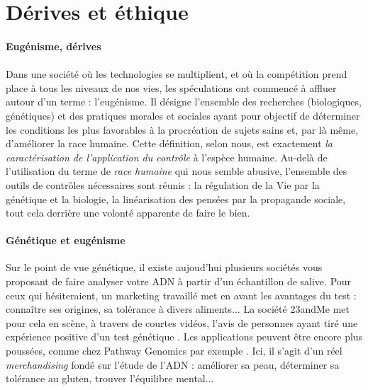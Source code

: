\section{Dérives et éthique}

\paragraph{Eugénisme, dérives}

\paragraph{} Dans une société où les technologies se multiplient, et où la compétition prend place
à tous les niveaux de nos vies, les spéculations ont commencé à affluer autour d'un terme : l'eugénisme.
Il désigne l'ensemble des recherches (biologiques, génétiques) et des pratiques morales et sociales
ayant pour objectif de \guillemotleft déterminer les conditions les plus favorables à la procréation
de sujets sains et, par là même, d'améliorer la race humaine\guillemotright  \cite{Eugenisme0}. Cette
définition, selon nous, est exactement \emph{la caractérisation de l'application du contrôle} à l'espèce
humaine. Au-delà de l'utilisation du terme de \emph{race humaine} qui nous semble abusive, l'ensemble des
outils de contrôles nécessaires sont réunis : la régulation de la Vie par la génétique et la biologie, la
linéarisation des pensées par la propagande sociale, tout cela derrière une volonté apparente de faire le bien.

\paragraph{Génétique et eugénisme} Sur le point de vue génétique, il existe aujoud'hui plusieurs sociétés
vous proposant de faire analyser votre ADN à partir d'un échantillon de salive. Pour ceux qui hésiteraient,
un marketing travaillé met en avant les avantages du test : connaître ses origines, sa tolérance à divers
aliments... La société 23andMe met pour cela en scène, à travers de courtes vidéos, l'avis de personnes
ayant tiré une expérience positive d'un test génétique \cite{23andMe}. Les applications peuvent être 
encore plus poussées, comme chez Pathway Genomics par exemple \cite{Pathway0}. Ici, il s'agit d'un réel
\emph{merchandising} fondé sur l'étude de l'ADN : améliorer sa peau, déterminer sa tolérance au gluten, 
trouver l'équilibre mental...

